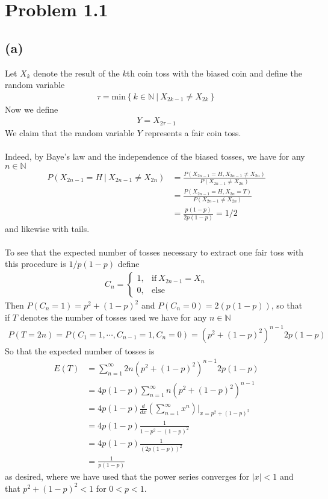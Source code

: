 \documentclass[11pt]{article}
\newcommand{\N}{\mathbb{N}}
\begin{document}
\section*{Problem 1.1}
\subsection*{(a)}
Let $X_k$ denote the result of the $k$th coin toss with the biased coin and define the random variable
\begin{align*}
	\tau=\text{min}\left\{ k \in \N \ | \ X_{2k-1} \neq X_{2k} \right\}
\end{align*}
Now we define
\begin{align*}
	Y= X_{2\tau-1}
\end{align*}
We claim that the random variable $Y$ represents a fair coin toss. \\ \\
Indeed, by Baye's law and the independence of the biased tosses, we have for any $n \in \N$
\begin{align*}
	P(X_{2n-1}=H \ | \ X_{2n-1} \neq X_{2n})&= \frac{P\left( X_{2n-1}=H, X_{2n-1} \neq X_{2n} \right)}{P\left( X_{2n-1} \neq X_{2n} \right)} \\
	&= \frac{P\left( X_{2n-1}=H, X_{2n}=T \right)}{P\left( X_{2n-1} \neq X_{2n} \right)} \\
	&= \frac{p(1-p)}{2p(1-p)}=1/2
\end{align*}
and likewise with tails. \\ \\
To see that the expected number of tosses necessary to extract one fair toss with this procedure is $1/p(1-p)$ define
\begin{align*}
	C_n= \begin{cases}
		1,  & \text{if} \ X_{2n-1}=X_n \\
		0,  & \text{else}
	\end{cases}
\end{align*}
Then $P(C_n =1)=p^2+(1-p)^2$ and $P(C_n=0)=2(p(1-p))$, so that if $T$ denotes the number of tosses used we have for any $n \in \N$
\begin{align*}
	P\left( T=2n \right)=P\left( C_1=1,\cdots,C_{n-1}=1, C_n=0 \right)=(p^2+(1-p)^2)^{n-1}2p(1-p) 
\end{align*}
So that the expected number of tosses is
\begin{align*}
	E\left( T \right)&= \sum_{n=1}^{\infty}2n\left( p^2+(1-p)^2 \right)^{n-1}2p(1-p) \\
	&=4p(1-p) \sum_{n=1}^{\infty}n\left( p^2+(1-p)^2 \right)^{n-1} \\
	&=4p(1-p)\frac{d}{dx}\left( \sum_{n=1}^{\infty}x^n \right)\Bigg|_{x=p^2+(1-p)^2} \\
	&= 4p(1-p)\frac{1}{1-p^2-(1-p)^2} \\
	&=4p(1-p)\frac{1}{(2p(1-p))^2} \\
	&=\frac{1}{p(1-p)}
\end{align*}
as desired, where we have used that the power series converges for $|x|<1$ and that $p^2+(1-p)^2<1$ for $0<p<1$.
\end{document}
